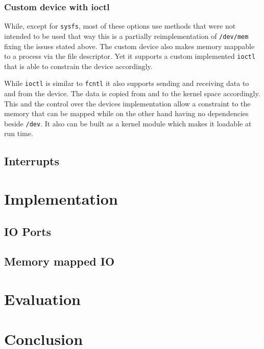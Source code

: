 \documentclass[
a4paper,
12pt,
notitlepage,
parskip=half,
DIV=11,
]{scrbook}
\begin{document}
		\subsection{Custom device with ioctl}
		
		While, except for \texttt{sysfs}, most of these options use methods that were not intended to be used that way this is a partially reimplementation of \texttt{/dev/mem} fixing the issues stated above.
		The custom device also makes memory mappable to a process via the file descriptor.
		Yet it supports a custom implemented \texttt{ioctl} that is able to constrain the device accordingly.
		
		While \texttt{ioctl} is similar to \texttt{fcntl} it also supports sending and receiving data to and from the device.
		The data is copied from and to the kernel space accordingly.
		This and the control over the devices implementation allow a constraint to the memory that can be mapped while on the other hand having no dependencies beside \texttt{/dev}.
		It also can be built as a kernel module which makes it loadable at run time. \citep{ioctl}
		
		\section{Interrupts}
		
		
	\chapter{Implementation}
	
	\section{IO Ports}
	
	\section{Memory mapped IO}
	
	
	\chapter{Evaluation}
	\chapter{Conclusion}
	
	
	
	
\end{document}

